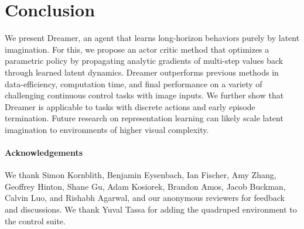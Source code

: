 \section{Conclusion}

We present Dreamer, an agent that learns long-horizon behaviors purely by latent imagination. For this, we propose an actor critic method that optimizes a parametric policy by propagating analytic gradients of multi-step values back through learned latent dynamics. Dreamer outperforms previous methods in data-efficiency, computation time, and final performance on a variety of challenging continuous control tasks with image inputs. We further show that Dreamer is applicable to tasks with discrete actions and early episode termination. Future research on representation learning can likely scale latent imagination to environments of higher visual complexity.

\paragraph{Acknowledgements}

We thank Simon Kornblith, Benjamin Eysenbach, Ian Fischer, Amy Zhang, Geoffrey Hinton, Shane Gu, Adam Kosiorek, Brandon Amos, Jacob Buckman, Calvin Luo, and Rishabh Agarwal, and our anonymous reviewers for feedback and discussions. We thank Yuval Tassa for adding the quadruped environment to the control suite.